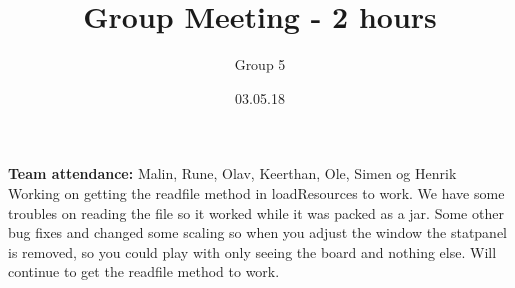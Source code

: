 \documentclass{article}
\title{Group Meeting - 2 hours}
\author{Group 5}
\date{03.05.18}
\begin{document}
	\maketitle
	\noindent
	\textbf{Team attendance:}  Malin, Rune, Olav, Keerthan, Ole, Simen og Henrik \\
  \noindent
Working on getting the readfile method in loadResources to work. We have some troubles on reading the file
so it worked while it was packed as a jar. Some other bug fixes and changed some scaling so when you
adjust the window the statpanel is removed, so you could play with only seeing the board and nothing else.
Will continue to get the readfile method to work. 
\end{document}
